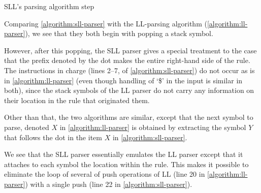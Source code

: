 \begin{algorithm}[h]
  \caption{\label{algorithm:sll-parser}
  SLL's parsing algorithm step}
  \begin{algorithmic}[1]
        \ELSE
        \FI %
      \FI %
      \CONTINUE{}
    \FI
        \CONTINUE{}
      \FI
        \CONTINUE{}
      \FI %
    \FI %
  \end{algorithmic}
\end{algorithm}

Comparing \cref{algorithm:sll-parser} with the LL-parsing algorithm
(\cref{algorithm:ll-parser}), we see that they both begin with popping a stack 
symbol. 

However, after this popping, the SLL parser gives a special treatment to the
case that the prefix denoted by the dot makes the entire right-hand side of the
rule. The instructions in charge (lines 2--7, of \cref{algorithm:sll-parser})
do not occur as is in \cref{algorithm:ll-parser} (even though handling of `\$'
in the input is similar in both), since the stack symbols of the LL parser do
not carry any information on their location in the rule that originated them. 

Other than that, the two algorithms are similar, except that the next symbol to
parse, denoted $X$ in \cref{algorithm:ll-parser} is obtained by extracting the
symbol $Y$ that follows the dot in the item $X$ in \cref{algorithm:sll-parser}.

We see that the SLL parser essentially emulates the LL parser except that it
attaches to each symbol the location within the rule. This makes it possible to
eliminate the loop of several of push operations of LL (line 20 in
\cref{algorithm:ll-parser}) with a single push (line 22 in
\cref{algorithm:sll-parser}). 

